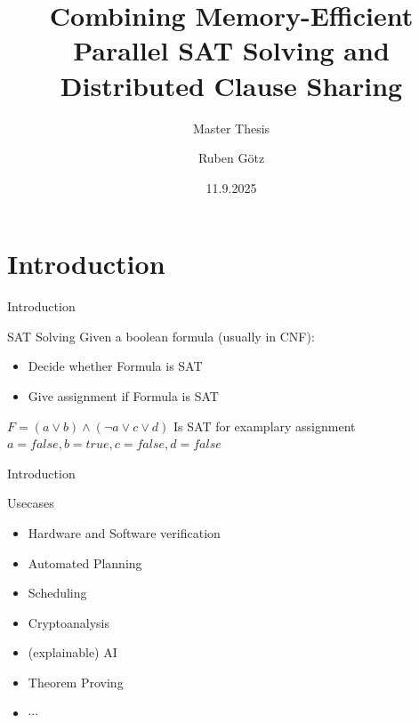 \documentclass{beamer}
\title{Combining Memory-Efficient Parallel SAT Solving and Distributed Clause Sharing}
\subtitle{Master Thesis}
\author{Ruben Götz}
\date{11.9.2025}
\begin{document}
\frame{\titlepage}

\section{Introduction}
\begin{frame}{Introduction}
    \begin{block}{SAT Solving}
        Given a boolean formula (usually in CNF):
        \begin{itemize}
            \item Decide whether Formula is SAT
            \item Give assignment if Formula is SAT
        \end{itemize}
    \end{block}

    \begin{exampleblock}{$F = (a \lor b) \land (\lnot a \lor c \lor d)$}
        Is SAT for examplary assignment $a = false, b = true, c = false, d = false$
    \end{exampleblock}
\end{frame}

\begin{frame}{Introduction}
    \begin{block}{Usecases}
        \begin{itemize}
            \item Hardware and Software verification
            \item Automated Planning
            \item Scheduling
            \item Cryptoanalysis
            \item (explainable) AI
            \item Theorem Proving
            \item $\cdots$
        \end{itemize}
    \end{block}
\end{frame}
\end{document}
